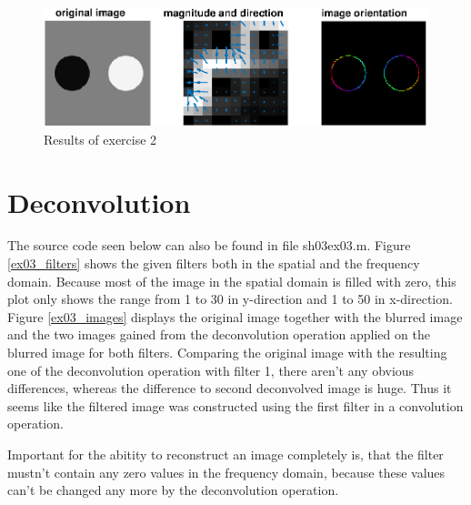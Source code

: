 \documentclass{article}
\begin{document}
\hspace{20mm}



\begin{figure}[H]
  \begin{center}
    \includegraphics[width=\textwidth]{./images/ex02.eps}
    \caption{Results of exercise 2}
    \label{ex02}
  \end{center}
\end{figure}

\clearpage
\section{Deconvolution}
The source code seen below can also be found in file sh03ex03.m. Figure \ref{ex03_filters} shows the given filters both in the spatial and the frequency domain. Because most of the image in the spatial domain is filled with zero, this plot only shows the range from 1 to 30 in y-direction and 1 to 50 in x-direction. Figure \ref{ex03_images} displays the original image together with the blurred image and the two images gained from the deconvolution operation applied on the blurred image for both filters.
Comparing the original image with the resulting one of the deconvolution operation with filter 1, there aren't any obvious differences, whereas the difference to second deconvolved image is huge. Thus it seems like the filtered image was constructed using the first filter in a convolution operation.

Important for the abitity to reconstruct an image completely is, that the filter mustn't contain any zero values in the frequency domain, because these values can't be changed any more by the deconvolution operation.


\hspace{20mm}

\end{document}
